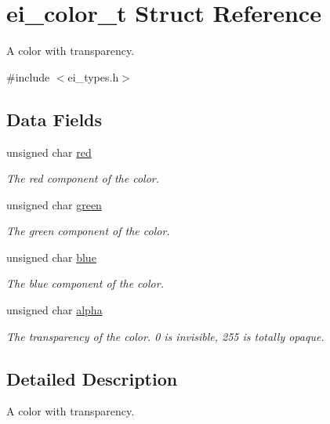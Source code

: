 \hypertarget{structei__color__t}{\section{ei\-\_\-color\-\_\-t Struct Reference}
\label{structei__color__t}
}


A color with transparency.  




{\ttfamily \#include $<$ei\-\_\-types.\-h$>$}

\subsection*{Data Fields}
\begin{DoxyCompactItemize}
\item 
unsigned char \hyperlink{structei__color__t_a9adf283c79176b3426ac63784f0bc17b}{red}
\begin{DoxyCompactList}\small\item\em The red component of the color. \end{DoxyCompactList}\item 
unsigned char \hyperlink{structei__color__t_ad85ce262fb9c76fe3c52b4eed19505d1}{green}
\begin{DoxyCompactList}\small\item\em The green component of the color. \end{DoxyCompactList}\item 
unsigned char \hyperlink{structei__color__t_af8d67b7a72cbb586519b55033350fb8c}{blue}
\begin{DoxyCompactList}\small\item\em The blue component of the color. \end{DoxyCompactList}\item 
unsigned char \hyperlink{structei__color__t_af213a14356db920b1a04f5270263ae61}{alpha}
\begin{DoxyCompactList}\small\item\em The transparency of the color. 0 is invisible, 255 is totally opaque. \end{DoxyCompactList}\end{DoxyCompactItemize}


\subsection{Detailed Description}
A color with transparency. 


